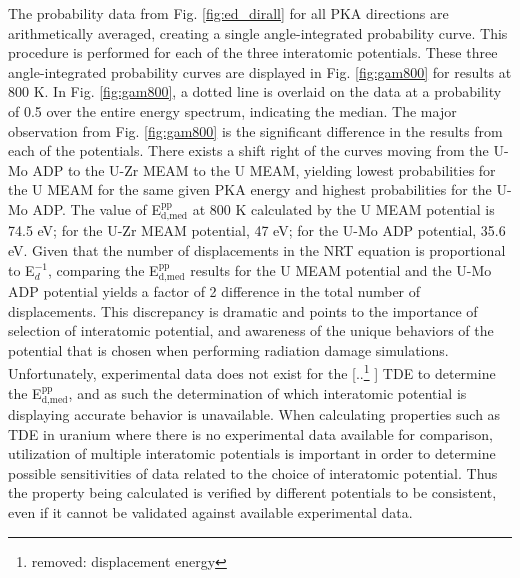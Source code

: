 \documentclass[review]{elsarticle}
\providecommand{\DIFaddtex}[1]{{\protect\color{blue} \sf #1}} %
\providecommand{\DIFdeltex}[1]{{\protect\color{red} [..\footnote{removed: #1} ]}} %
\providecommand{\DIFaddbegin}{} %
\providecommand{\DIFaddend}{} %
\providecommand{\DIFdelbegin}{} %
\providecommand{\DIFdelend}{} %
\providecommand{\DIFadd}[1]{\texorpdfstring{\DIFaddtex{#1}}{#1}} %
\providecommand{\DIFdel}[1]{\texorpdfstring{\DIFdeltex{#1}}{}} %
\newcommand{\DIFscaledelfig}{0.5}
\newlength{\DIFdelgraphicswidth} %
\newlength{\DIFdelgraphicsheight} %
\newcommand{\DIFaddincludegraphics}[2][]{{\color{blue}\fbox{\DIFOincludegraphics[#1]{#2}}}} %
\newcommand{\DIFdelincludegraphics}[2][]{%
\sbox{\DIFdelgraphicsbox}{\DIFOincludegraphics[#1]{#2}}%
\settoboxwidth{\DIFdelgraphicswidth}{\DIFdelgraphicsbox} %
\settoboxtotalheight{\DIFdelgraphicsheight}{\DIFdelgraphicsbox} %
\scalebox{\DIFscaledelfig}{%
\parbox[b]{\DIFdelgraphicswidth}{\usebox{\DIFdelgraphicsbox}\\[-\baselineskip] \rule{\DIFdelgraphicswidth}{0em}}\llap{\resizebox{\DIFdelgraphicswidth}{\DIFdelgraphicsheight}{%
\setlength{\unitlength}{\DIFdelgraphicswidth}%
\begin{picture}(1,1)%
\thicklines\linethickness{2pt} %
{\color[rgb]{1,0,0}\put(0,0){\framebox(1,1){}}}%
{\color[rgb]{1,0,0}\put(0,0){\line( 1,1){1}}}%
{\color[rgb]{1,0,0}\put(0,1){\line(1,-1){1}}}%
\end{picture}%
}\hspace*{3pt}}} %
} %
\DeclareRobustCommand{\DIFaddbegin}{\DIFOaddbegin \let\includegraphics\DIFaddincludegraphics} %
\DeclareRobustCommand{\DIFaddend}{\DIFOaddend \let\includegraphics\DIFOincludegraphics} %
\DeclareRobustCommand{\DIFdelbegin}{\DIFOdelbegin \let\includegraphics\DIFdelincludegraphics} %
\DeclareRobustCommand{\DIFdelend}{\DIFOaddend \let\includegraphics\DIFOincludegraphics} %
\begin{document}
The probability data from Fig. \ref{fig:ed_dirall} for all PKA directions are arithmetically averaged, creating a single angle-integrated probability curve. This procedure is performed for each of the three interatomic potentials. These three angle-integrated probability curves are displayed in Fig. \ref{fig:gam800} for results at 800 K. In Fig. \ref{fig:gam800}, a dotted line is overlaid on the data at a probability of 0.5 over the entire energy spectrum, indicating the median. The major observation from Fig. \ref{fig:gam800} is the significant difference in the results from each of the potentials. There exists a shift right of the curves moving from the U-Mo ADP to the U-Zr MEAM to the U MEAM, yielding lowest probabilities for the U MEAM for the same given PKA energy and highest probabilities for the U-Mo ADP. The value of E$^{\textrm{pp}}_{\textrm{d,med}}$ at 800 K calculated by the U MEAM potential is 74.5 eV; for the U-Zr MEAM potential, 47 eV; for the U-Mo ADP potential, 35.6 eV. Given that the number of displacements in the NRT equation \cite{norgett1975} is proportional to E$_{d}^{-1}$, comparing the E$^{\textrm{pp}}_{\textrm{d,med}}$ results for the U MEAM potential and the U-Mo ADP potential yields a factor of 2 difference in the total number of displacements. This discrepancy is dramatic and points to the importance of selection of interatomic potential, and awareness of the unique behaviors of the potential that is chosen when performing radiation damage simulations. Unfortunately, experimental data does not exist for the \DIFdelbegin \DIFdel{displacement energy }\DIFdelend \DIFaddbegin \DIFadd{TDE }\DIFaddend to determine the E$^{\textrm{pp}}_{\textrm{d,med}}$, and as such the determination of which interatomic potential is displaying accurate behavior is unavailable. \DIFaddbegin \DIFadd{When calculating properties such as TDE in uranium where there is no experimental data available for comparison, utilization of multiple interatomic potentials is important in order to determine possible sensitivities of data related to the choice of interatomic potential. Thus the property being calculated is verified by different potentials to be consistent, even if it cannot be validated against available experimental data.
}\DIFaddend 
\end{document}
